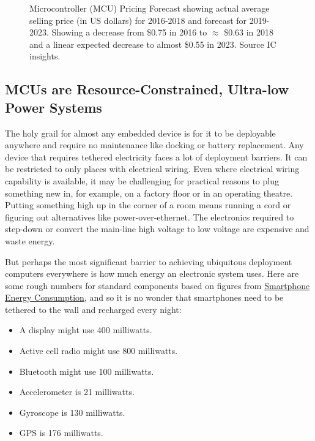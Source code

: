 \begin{figure}
    \caption{Microcontroller (MCU) Pricing Forecast showing actual average selling price (in US dollars) for 2016-2018 and forecast for 2019-2023. Showing a decrease from \$0.75 in 2016 to $\approx$ \$0.63 in 2018 and a linear expected decrease to almost \$0.55 in 2023. Source IC insights.}
\end{figure}  







\subsection{MCUs are Resource-Constrained, Ultra-low Power Systems}

The holy grail for almost any embedded device is for it to be deployable anywhere and require no maintenance like docking or battery replacement. Any device that requires tethered electricity faces a lot of deployment barriers. It can be restricted to only places with electrical wiring. Even where electrical wiring capability is available, it may be challenging for practical reasons to plug something new in, for example, on a factory floor or in an operating theatre. Putting something high up in the corner of a room means running a cord or figuring out alternatives like power-over-ethernet. The electronics required to step-down or convert the main-line high voltage to low voltage are expensive and waste energy.

But perhaps the most significant barrier to achieving ubiquitous deployment computers everywhere is how much energy an electronic system uses. Here are some rough numbers for standard components based on figures from \href{https://www.cambridge.org/us/academic/subjects/engineering/wireless-communications/smartphone-energy-consumption-modeling-and-optimization}{Smartphone Energy Consumption}, and so it is no wonder that smartphones need to be tethered to the wall and recharged every night:

\begin{itemize}
    \item A display might use 400 milliwatts.
    \item Active cell radio might use 800 milliwatts.
    \item Bluetooth might use 100 milliwatts.
    \item Accelerometer is 21 milliwatts.
    \item Gyroscope is 130 milliwatts.
    \item GPS is 176 milliwatts.
\end{itemize}

